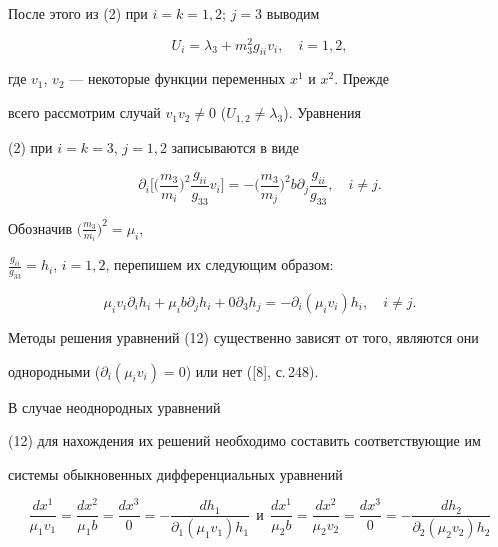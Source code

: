 После этого из (2) при $i=k=1,2$; $j=3$ выводим 


\begin{equation} 


U_i=\lambda_3+m^2_3g_{ii}v_i,\quad i=1,2, 


\end{equation} 


где $v_1$, $v_2$ --- некоторые функции переменных $x^1$ и $x^2$. Прежде 


всего рассмотрим случай $v_1v_2\ne0$ ($U_{1,2}\ne\lambda_3$). Уравнения 


(2) при $i=k=3$, $j=1,2$ записываются в виде 


$$ 


\partial_i\bigg[\bigg(\frac{m_3}{m_i}\bigg)^2\frac{g_{ii}}{g_{33}} 


v_i\bigg]=-\bigg(\frac{m_3}{m_j}\bigg)^2b\partial_j 


\frac{g_{ii}}{g_{33}},\quad i\ne j. 


$$ 


 


Обозначив $\big(\frac{m_3}{m_i}\big)^2=\mu_i$, 


$\frac{g_{ii}}{g_{33}}=h_i$, $i=1,2$, перепишем их следующим образом: 


\begin{equation} 


\mu_i v_i\partial_i h_i+\mu_i b\partial_j h_i+0\partial_3h_j=- 


\partial_i(\mu_i v_i)h_i,\quad i\ne j. 


\end{equation} 


 


Методы решения уравнений (12) существенно зависят от того, являются они 


однородными ($\partial_i(\mu_i v_i)=0$) или нет ([8], с.\,248). 


В случае неоднородных уравнений 


(12) для нахождения их решений необходимо составить соответствующие им 


системы обыкновенных дифференциальных уравнений 


\begin{equation} 


\frac{dx^1}{\mu_1v_1}=\frac{dx^2}{\mu_1b}=\frac{dx^3}{0} 


=-\frac{dh_1}{\partial_1(\mu_1v_1)h_1}\ \ \text{и} \ \ 


\frac{dx^1}{\mu_2b}=\frac{dx^2}{\mu_2v_2}=\frac{dx^3}{0}= 


-\frac{dh_2}{\partial_2(\mu_2v_2)h_2} 


\end{equation} 


